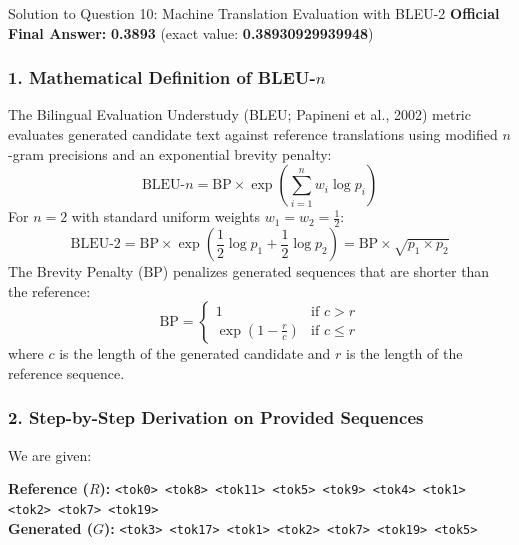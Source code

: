 \documentclass[11pt,a4paper]{article}
\begin{document}
\begin{solutionbox}{Solution to Question 10: Machine Translation Evaluation with BLEU-2}
\textbf{Official Final Answer:} \textbf{0.3893} (exact value: \textbf{0.38930929939948})

\subsubsection*{1. Mathematical Definition of BLEU-$n$}
The Bilingual Evaluation Understudy (BLEU; Papineni et al., 2002) metric evaluates generated candidate text against reference translations using modified $n$-gram precisions and an exponential brevity penalty:
\begin{equation}
\text{BLEU-}n = \text{BP} \times \exp\left( \sum_{i=1}^n w_i \log p_i \right)
\end{equation}
For $n = 2$ with standard uniform weights $w_1 = w_2 = \frac{1}{2}$:
\begin{equation}
\text{BLEU-2} = \text{BP} \times \exp\left( \frac{1}{2} \log p_1 + \frac{1}{2} \log p_2 \right) = \text{BP} \times \sqrt{p_1 \times p_2}
\end{equation}
The Brevity Penalty ($\text{BP}$) penalizes generated sequences that are shorter than the reference:
\begin{equation}
\text{BP} = \begin{cases}
1 & \text{if } c > r \\
\exp\left( 1 - \frac{r}{c} \right) & \text{if } c \le r
\end{cases}
\end{equation}
where $c$ is the length of the generated candidate and $r$ is the length of the reference sequence.

\subsubsection*{2. Step-by-Step Derivation on Provided Sequences}
We are given:
\begin{center}
\begin{tcolorbox}[enhanced,colback=codebg,colframe=gray!30,arc=1.5mm,boxrule=0.6pt,width=0.96\linewidth]
\small
\textbf{Reference ($R$):} \texttt{<tok0> <tok8> <tok11> <tok5> <tok9> <tok4> <tok1> <tok2> <tok7> <tok19>}\\[3pt]
\textbf{Generated ($G$):} \texttt{<tok3> <tok17> <tok1> <tok2> <tok7> <tok19> <tok5>}
\end{tcolorbox}
\end{center}


\end{solutionbox}
\end{document}

